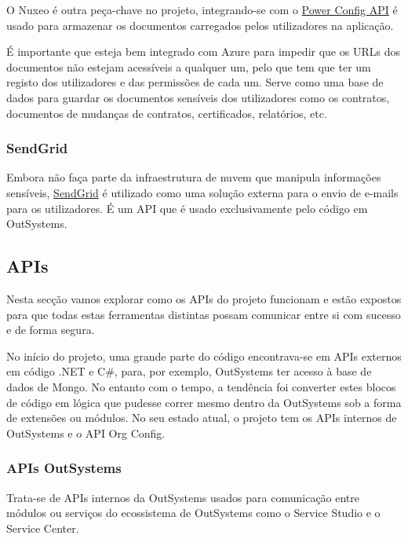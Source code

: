             O Nuxeo é outra peça-chave no projeto, integrando-se com o \hyperref[secsec:apis]{Power Config API} é usado para armazenar os documentos carregados pelos utilizadores na aplicação.

            É importante que esteja bem integrado com Azure para impedir que os URLs dos documentos não estejam acessíveis a qualquer um, pelo que tem que ter um registo dos utilizadores e das permissões de cada um. Serve como uma base de dados para guardar os documentos sensíveis dos utilizadores como os contratos, documentos de mudanças de contratos, certificados, relatórios, etc. %
        
        \subsubsection{SendGrid}\label{secsec:sendgrid}

            Embora não faça parte da infraestrutura de nuvem que manipula informações sensíveis, \href{https://sendgrid.com/en-us/pricing}{SendGrid} é utilizado como uma solução externa para o envio de e-mails para os utilizadores. É um API que é usado exclusivamente pelo código em OutSystems.
    
        \subsection{APIs}\label{secsec:apis}

            Nesta secção vamos explorar como os APIs do projeto funcionam e estão expostos para que todas estas ferramentas distintas possam comunicar entre si com sucesso e de forma segura.

            No início do projeto, uma grande parte do código encontrava-se em APIs externos em código .NET e C\#, para, por exemplo, OutSystems ter acesso à base de dados de Mongo. No entanto com o tempo, a tendência foi converter estes blocos de código em lógica que pudesse correr mesmo dentro da OutSystems sob a forma de extensões ou módulos. No seu estado atual, o projeto tem os APIs internos de OutSystems e o API Org Config.

            \subsubsection{APIs OutSystems}\label{secsec:apis-os}
                Trata-se de APIs internos da OutSystems usados para comunicação entre módulos ou serviços do ecossistema de OutSystems como o Service Studio e o Service Center. 

